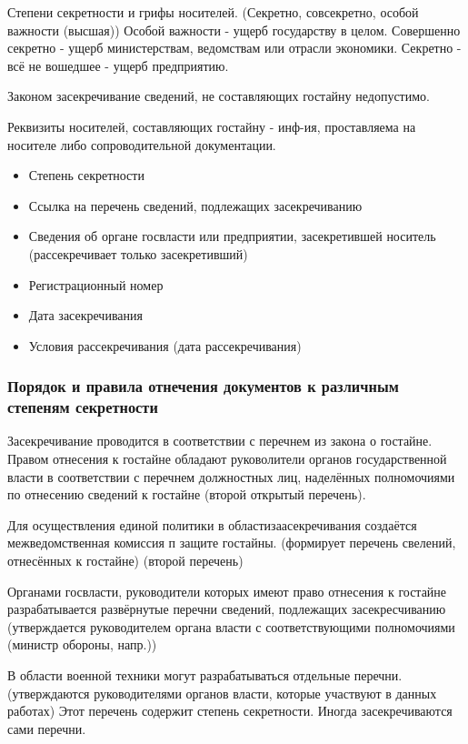 \documentclass[a4paper,12pt]{report}
\begin{document}
	Степени секретности и грифы носителей. (Секретно, совсекретно, особой важности (высшая))
	Особой важности - ущерб государству в целом.
	Совершенно секретно - ущерб министерствам, ведомствам или отрасли экономики.
	Секретно - всё не вошедшее - ущерб предприятию.

	Законом засекречивание сведений, не составляющих гостайну недопустимо.


	Реквизиты носителей, составляющих гостайну - инф-ия, проставляема на носителе либо сопроводительной документации.
		\begin{itemize}
		\item 	Степень секретности
		\item 	Ссылка на перечень сведений, подлежащих засекречиванию
		\item 	Сведения об органе госвласти или предприятии, засекретившей носитель (рассекречивает только засекретивший)
		\item 	Регистрационный номер
		\item 	Дата засекречивания
		\item 	Условия рассекречивания (дата рассекречивания)
		\end{itemize}

	\subsubsection{Порядок и правила отнечения документов к различным степеням секретности}
	Засекречивание проводится в соответствии с перечнем из закона о гостайне.
	Правом отнесения к гостайне обладают руковолители органов государственной власти в соответствии с перечнем должностных лиц, наделённых полномочиями по отнесению сведений к гостайне (второй открытый перечень).

	Для осуществления единой политики в областизаасекречивания создаётся межведомственная комиссия п защите гостайны. (формирует перечень свелений, отнесённых к гостайне) (второй перечень)

	Органами госвласти, руководители которых имеют право отнесения к гостайне разрабатывается развёрнутые перечни сведений, подлежащих засекресчиванию (утверждается руководителем органа власти с соответствующими полномочиями (министр обороны, напр.))

	В области военной техники могут разрабатываться отдельные перечни. (утверждаются руководителями органов власти, которые участвуют в данных работах)
	Этот перечень содержит степень секретности. Иногда засекречиваются сами перечни.
\end{document}
